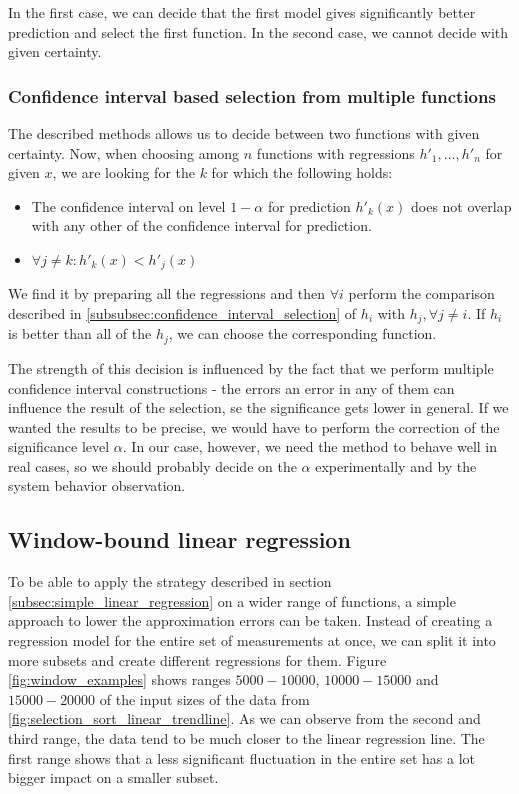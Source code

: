 In the first case, we can decide that the first model gives significantly better prediction and select the first function. In the second case, we cannot decide with given certainty.

\subsubsection{Confidence interval based selection from multiple functions}

The described methods allows us to decide between two functions with given certainty. Now, when choosing among $n$ functions with regressions $h'_1, ..., h'_n$ for given $x$, we are looking for the $k$ for which the following holds:

\begin{itemize}
	\item The confidence interval on level $1-\alpha$ for prediction $h'_k(x)$ does not overlap with any other of the confidence interval for prediction.
	\item $\forall j \ne k: h'_k(x) < h'_j(x)$
\end{itemize}

We find it by preparing all the regressions and then $\forall i$ perform the comparison described in \ref{subsubsec:confidence_interval_selection} of $h_i$ with $h_j, \forall j \ne i$. If $h_i$ is better than all of the $h_j$, we can choose the corresponding function.

The strength of this decision is influenced by the fact that we perform multiple confidence interval constructions - the errors an error in any of them can influence the result of the selection, se the significance gets lower in general. If we wanted the results to be precise, we would have to perform the correction of the significance level $\alpha$. In our case, however, we need the method to behave well in real cases, so we should probably decide on the $\alpha$ experimentally and by the system behavior observation.

\subsection{Window-bound linear regression}
\label{subsec:window_bound_regression}

To be able to apply the strategy described in section \ref{subsec:simple_linear_regression} on a wider range of functions, a simple approach to lower the approximation errors can be taken. Instead of creating a regression model for the entire set of measurements at once, we can split it into more subsets and create different regressions for them. Figure \ref{fig:window_examples} shows ranges $5000 - 10000$, $10000-15000$ and $15000-20000$ of the input sizes of the data from \ref{fig:selection_sort_linear_trendline}. As we can observe from the second and third range, the data tend to be much closer to the linear regression line. The first range shows that a less significant fluctuation in the entire set has a lot bigger impact on a smaller subset.

